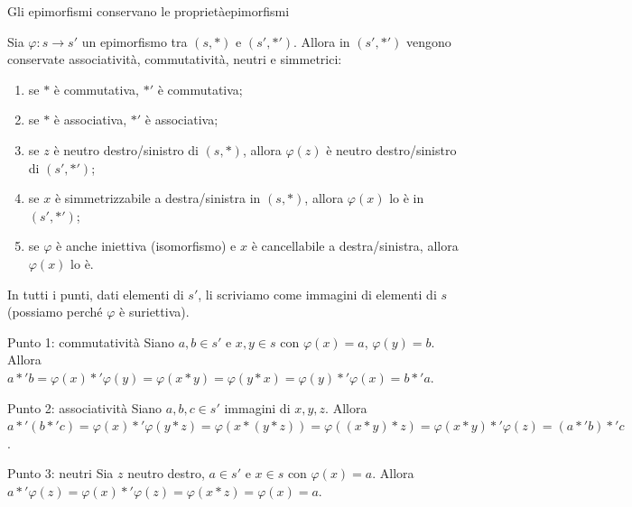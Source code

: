 \begin{concetto}
\begin{Teorema}{Gli epimorfismi conservano le proprietà}{epimorfismi}
    \begin{prerequisiti}
    \end{prerequisiti}
    Sia $\varphi \colon s \to s'$ un epimorfismo tra $(s, *)$ e $(s', *')$. Allora in $(s', *')$ vengono conservate associatività,
    commutatività, neutri e simmetrici:
    \begin{enumerate}
        \item se $*$ è commutativa, $*'$ è commutativa;
        \item se $*$ è associativa, $*'$ è associativa;
        \item se $z$ è neutro destro/sinistro di $(s, *)$, allora $\varphi(z)$ è neutro destro/sinistro di $(s', *')$;
        \item se $x$ è simmetrizzabile a destra/sinistra in $(s, *)$, allora $\varphi(x)$ lo è in $(s', *')$;
        \item se $\varphi$ è anche iniettiva (isomorfismo) e $x$ è cancellabile a destra/sinistra, allora $\varphi(x)$ lo è.
    \end{enumerate}
\end{Teorema}
\begin{dimostrazione}
    In tutti i punti, dati elementi di $s'$, li scriviamo come immagini di elementi di $s$ (possiamo perché $\varphi$ è suriettiva).
    \begin{caso}{Punto 1: commutatività}
        Siano $a, b \in s'$ e $x, y \in s$ con $\varphi(x) = a$, $\varphi(y) = b$. Allora
        $a *' b = \varphi(x) *' \varphi(y) = \varphi(x * y) = \varphi(y * x) = \varphi(y) *' \varphi(x) = b *' a$.
    \end{caso}
    \begin{caso}{Punto 2: associatività}
        Siano $a, b, c \in s'$ immagini di $x, y, z$. Allora
        $a *' (b *' c) = \varphi(x) *' \varphi(y * z) = \varphi(x * (y * z)) = \varphi((x * y) * z) = \varphi(x * y) *' \varphi(z) = (a *' b) *' c$.
    \end{caso}
    \begin{caso}{Punto 3: neutri}
        Sia $z$ neutro destro, $a \in s'$ e $x \in s$ con $\varphi(x) = a$. Allora $a *' \varphi(z) = \varphi(x) *' \varphi(z) = \varphi(x * z) = \varphi(x) = a$.

\end{caso}
\end{dimostrazione}
\end{concetto}

